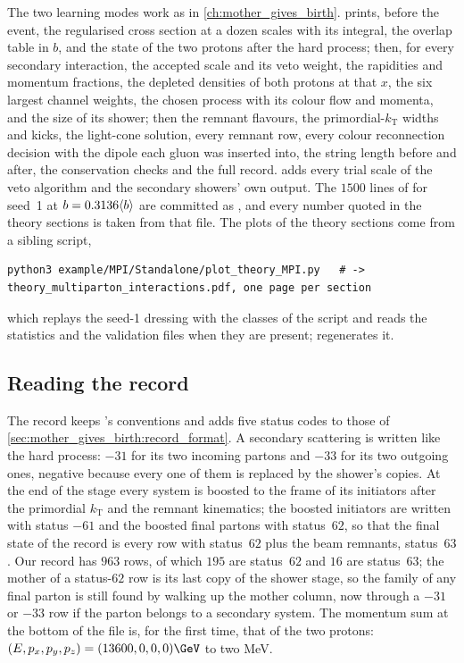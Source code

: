 The two learning modes work as in \cref{ch:mother_gives_birth}. 
prints, before the event, the regularised cross section at a dozen scales
with its integral, the overlap table in $b$, and the state of the two
protons after the hard process; then, for every secondary interaction, the
accepted scale and its veto weight, the rapidities and momentum fractions,
the depleted densities of both protons at that $x$, the six largest channel
weights, the chosen process with its colour flow and momenta, and the size
of its shower; then the remnant flavours, the primordial-$k_{\mathrm{T}}$
widths and kicks, the light-cone solution, every remnant row, every colour
reconnection decision with the dipole each gluon was inserted into, the
string length before and after, the conservation checks and the full
record.  adds every trial scale of the veto algorithm and the
secondary showers' own  output. The $1500$ lines of  for
seed~1 at $b=0.3136\langle b\rangle$ are committed as
, and
every number quoted in the theory sections is taken from that file. The
plots of the theory sections come from a sibling script,
\begin{verbatim}
python3 example/MPI/Standalone/plot_theory_MPI.py   # -> theory_multiparton_interactions.pdf, one page per section
\end{verbatim}
which replays the seed-1 dressing with the classes of the script and reads
the  statistics and the \PYTHIA validation files when they
are present;  regenerates it.

\subsection{Reading the record}
\label{sec:uninvited_cousins:record_format}

The record keeps \PYTHIA's conventions and adds five status codes to those
of \cref{sec:mother_gives_birth:record_format}. A secondary scattering is
written like the hard process: $-31$ for its two incoming partons and $-33$
for its two outgoing ones, negative because every one of them is replaced by
the shower's copies. At the end of the stage every system is boosted to the
frame of its initiators after the primordial $k_{\mathrm{T}}$ and the
remnant kinematics; the boosted initiators are written with status $-61$ and
the boosted final partons with status~$62$, so that the final state of the
record is every row with status~$62$ plus the beam remnants, status~$63$.
Our record has $963$ rows, of which $195$ are status~$62$ and $16$ are
status~$63$; the mother of a status-$62$ row is its last copy of the shower
stage, so the family of any final parton is still found by walking up the
mother column, now through a $-31$ or $-33$ row if the parton belongs to a
secondary system. The momentum sum at the bottom of the file is, for the
first time, that of the two protons: $(E,p_x,p_y,p_z)=(13600,0,0,0)\GeV$ to
two MeV.

